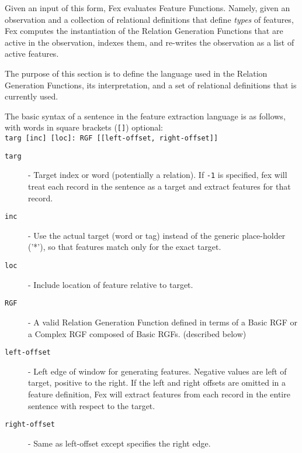 \documentclass[11pt]{article}
\begin{document}
Given an input of this form, Fex evaluates Feature Functions. Namely,
given an observation and a collection of relational definitions
that define {\em types} of features, Fex computes the instantiation of
the Relation Generation Functions that are active in the observation, 
indexes them, and re-writes the observation as a list of active features.

The purpose of this section is to define the language used in the
Relation Generation Functions, its interpretation, and a set of relational
definitions that is currently used.

The basic syntax of a sentence in the feature extraction language is as
follows, with words in square brackets ({\tt []}) optional: \\

{\tt targ [inc] [loc]: RGF [[left-offset, right-offset]]} \\

\begin{description}

\item[{\tt targ}] - Target index or word (potentially a relation). If {\tt -1} 
   is specified, fex will treat each record in the sentence as a target and 
      extract features for that record. 

\item[{\tt inc}] - Use the actual target (word or tag) instead of the generic
      place-holder ('*'), so that features match only for the exact
      target.

\item[{\tt loc}] - Include location of feature relative to target.

\item[{\tt RGF}] - A valid Relation Generation Function defined in terms of a
   Basic RGF or a Complex RGF composed of Basic RGFs. (described below)

\item[{\tt left-offset}] - Left edge of window for generating features. Negative
              values are left of target, positive to the right.  If the left
              and right offsets are omitted in a feature definition, Fex will
              extract features from each record in the entire sentence with
              respect to the target.

\item[{\tt right-offset}] - Same as left-offset except specifies the right edge.
\end{description}
\end{document}

